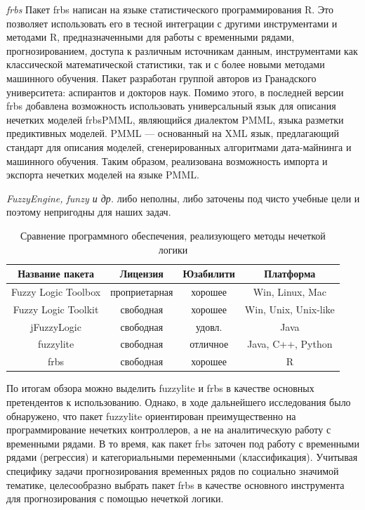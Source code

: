 \textit{frbs} Пакет frbs написан на языке статистического программирования R.
Это позволяет использовать его в тесной интеграции с другими инструментами и
методами R, предназначенными для работы с временными рядами, прогнозированием,
доступа к различным источникам данным, инструментами как классической
математической статистики, так и с более новыми методами машинного обучения.
Пакет разработан группой авторов из Гранадского университета: аспирантов и
докторов наук. Помимо этого, в последней версии frbs добавлена возможность
использовать универсальный язык для описания нечетких моделей frbsPMML,
являющийся диалектом PMML, языка разметки предиктивных моделей. PMML ---
основанный на XML язык, предлагающий стандарт для описания моделей,
сгенерированных алгоритмами дата-майнинга и машинного обучения. Таким образом,
реализована возможность импорта и экспорта нечетких моделей на языке PMML.

\textit{FuzzyEngine, funzy и др.} либо неполны, либо заточены под чисто учебные
цели и поэтому непригодны для наших задач. 

\begin{table}[bhtp]
    \caption{Сравнение программного обеспечения, реализующего методы нечеткой
        логики}
        \begin{tabular}{ | c | c | c | c |}
			\hline
            Название пакета & Лицензия & Юзабилити & Платформа \\
			\hline
            Fuzzy Logic Toolbox & проприетарная & хорошее &
            Win, Linux, Mac\\
			\hline
            Fuzzy Logic Toolkit & свободная & хорошее &
            Win, Unix, Unix-like\\
			\hline
            jFuzzyLogic & свободная & удовл. &
            Java\\
			\hline
            fuzzylite & свободная & отличное &
            Java, C++, Python\\
			\hline
            frbs & свободная & хорошее &
            R\\
			\hline
		\end{tabular}		
    \label{table:soft_comparison}	
\end{table}

По итогам обзора можно выделить fuzzylite и frbs в качестве основных
претендентов к использованию. Однако, в ходе дальнейшего исследования было
обнаружено, что пакет fuzzylite ориентирован преимущественно на программирование
нечетких контроллеров, а не на аналитическую работу с временными рядами. В то
время, как пакет frbs заточен под работу с временными рядами (регрессия) и
категориальными переменными (классификация). Учитывая специфику задачи
прогнозирования временных рядов по социально значимой тематике, целесообразно
выбрать пакет frbs в качестве основного инструмента для прогнозирования с
помощью нечеткой логики.

